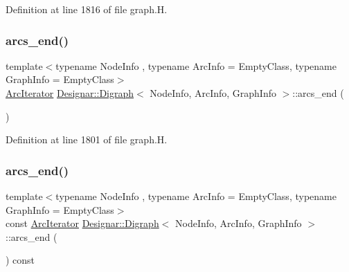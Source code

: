 Definition at line 1816 of file graph.\+H.

\mbox{\label{class_designar_1_1_digraph_af4e39baa2e8370cfda5f61f551b3091f}} 
\subsubsection{\texorpdfstring{arcs\+\_\+end()}{arcs\_end()}\hspace{0.1cm}{\footnotesize\ttfamily [1/4]}}
{\footnotesize\ttfamily template$<$typename Node\+Info , typename Arc\+Info  = Empty\+Class, typename Graph\+Info  = Empty\+Class$>$ \\
\hyperlink{class_designar_1_1_digraph_1_1_arc_iterator}{Arc\+Iterator} \hyperlink{class_designar_1_1_digraph}{Designar\+::\+Digraph}$<$ Node\+Info, Arc\+Info, Graph\+Info $>$\+::arcs\+\_\+end (\begin{DoxyParamCaption}{ }\end{DoxyParamCaption})\hspace{0.3cm}{\ttfamily [inline]}}



Definition at line 1801 of file graph.\+H.

\mbox{\label{class_designar_1_1_digraph_a128df54ce973f5b1f956407a7f565bc3}} 
\subsubsection{\texorpdfstring{arcs\+\_\+end()}{arcs\_end()}\hspace{0.1cm}{\footnotesize\ttfamily [2/4]}}
{\footnotesize\ttfamily template$<$typename Node\+Info , typename Arc\+Info  = Empty\+Class, typename Graph\+Info  = Empty\+Class$>$ \\
const \hyperlink{class_designar_1_1_digraph_1_1_arc_iterator}{Arc\+Iterator} \hyperlink{class_designar_1_1_digraph}{Designar\+::\+Digraph}$<$ Node\+Info, Arc\+Info, Graph\+Info $>$\+::arcs\+\_\+end (\begin{DoxyParamCaption}{ }\end{DoxyParamCaption}) const\hspace{0.3cm}{\ttfamily [inline]}}



